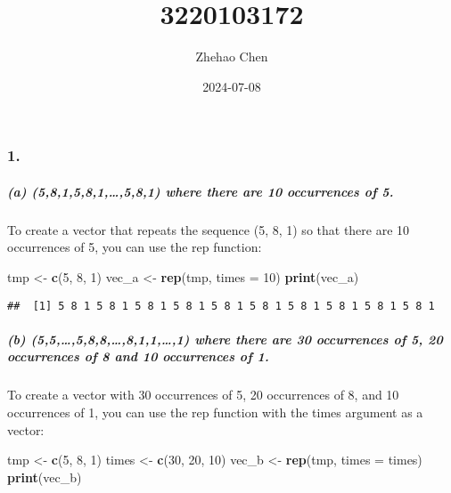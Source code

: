 \documentclass[
]{article}
\title{3220103172}
\author{Zhehao Chen}
\date{2024-07-08}
\newenvironment{Shaded}{\begin{snugshade}}{\end{snugshade}}
\newcommand{\AttributeTok}[1]{\textcolor[rgb]{0.13,0.29,0.53}{#1}}
\newcommand{\DecValTok}[1]{\textcolor[rgb]{0.00,0.00,0.81}{#1}}
\newcommand{\FunctionTok}[1]{\textcolor[rgb]{0.13,0.29,0.53}{\textbf{#1}}}
\newcommand{\NormalTok}[1]{#1}
\newcommand{\OtherTok}[1]{\textcolor[rgb]{0.56,0.35,0.01}{#1}}
\begin{document}
\maketitle

\subsubsection{1.}\label{section}

\subparagraph{(a) (5,8,1,5,8,1,\ldots,5,8,1) where there are 10
occurrences of
5.}\label{a-581581581-where-there-are-10-occurrences-of-5.}

To create a vector that repeats the sequence (5, 8, 1) so that there are
10 occurrences of 5, you can use the rep function:

\begin{Shaded}
\begin{Highlighting}[]
\NormalTok{tmp }\OtherTok{\textless{}{-}} \FunctionTok{c}\NormalTok{(}\DecValTok{5}\NormalTok{, }\DecValTok{8}\NormalTok{, }\DecValTok{1}\NormalTok{)}
\NormalTok{vec\_a }\OtherTok{\textless{}{-}} \FunctionTok{rep}\NormalTok{(tmp, }\AttributeTok{times =} \DecValTok{10}\NormalTok{)}
\FunctionTok{print}\NormalTok{(vec\_a)}
\end{Highlighting}
\end{Shaded}

\begin{verbatim}
##  [1] 5 8 1 5 8 1 5 8 1 5 8 1 5 8 1 5 8 1 5 8 1 5 8 1 5 8 1 5 8 1
\end{verbatim}

\subparagraph{(b) (5,5,\ldots,5,8,8,\ldots,8,1,1,\ldots,1) where there
are 30 occurrences of 5, 20 occurrences of 8 and 10 occurrences of
1.}\label{b-555888111-where-there-are-30-occurrences-of-5-20-occurrences-of-8-and-10-occurrences-of-1.}

To create a vector with 30 occurrences of 5, 20 occurrences of 8, and 10
occurrences of 1, you can use the rep function with the times argument
as a vector:

\begin{Shaded}
\begin{Highlighting}[]
\NormalTok{tmp }\OtherTok{\textless{}{-}} \FunctionTok{c}\NormalTok{(}\DecValTok{5}\NormalTok{, }\DecValTok{8}\NormalTok{, }\DecValTok{1}\NormalTok{)}
\NormalTok{times }\OtherTok{\textless{}{-}} \FunctionTok{c}\NormalTok{(}\DecValTok{30}\NormalTok{, }\DecValTok{20}\NormalTok{, }\DecValTok{10}\NormalTok{)}
\NormalTok{vec\_b }\OtherTok{\textless{}{-}} \FunctionTok{rep}\NormalTok{(tmp, }\AttributeTok{times =}\NormalTok{ times)}
\FunctionTok{print}\NormalTok{(vec\_b)}
\end{Highlighting}
\end{Shaded}
\end{document}
